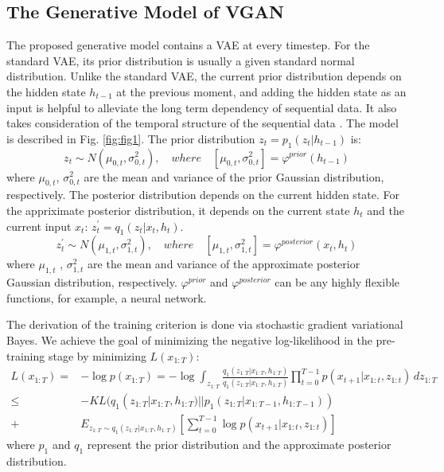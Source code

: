 \documentclass{llncs}
\begin{document}
\subsection{The Generative Model of VGAN}
	The proposed generative model contains a VAE at every timestep. For the standard VAE, its prior distribution is usually a given standard normal distribution. Unlike the standard VAE, the current prior distribution depends on the hidden state $h_{t-1}$ at the previous moment,  and adding the hidden state as an input is helpful to alleviate the long term dependency of sequential data. It also  takes consideration of the temporal structure of the sequential data \cite{chung2015a} \cite{serban2016a}. The model is described in Fig. \ref{fig:fig1}. The prior distribution $z_{t} = p_{1 }(z_{t}|h_{t-1})$ is:
% 
\begin{equation}
z_{t} \sim  N(\mu _{0,t},\sigma ^{2} _{0,t}) ,   \quad   where \quad  [\mu_{0,t},\sigma_{0,t}^2] = \varphi^{prior}(h_{t-1})
\label{eq:pathnode}
\end{equation}
where $\mu_{0,t}$, $\sigma_{0,t}^2$ are the mean and variance of the prior Gaussian distribution, respectively. The posterior distribution depends on the current hidden state.
For the appriximate posterior distribution, it depends on the current state $h_{t}$ and the current input $x_{t}$: $z_{t}^{\prime}=q_{1}(z_{t}|x_{t},h_{t})$.
\begin{equation}
z_{t}^{\prime} \sim N(\mu _{1,t},\sigma ^{2} _{1,t}) ,   \quad   where \quad  [\mu_{1,t},\sigma_{1,t}^2] = \varphi^{posterior}(x_{t},h_{t})
\label{eq:pathnode}
\end{equation}
where $\mu_{1,t}$ , $\sigma_{1,t}^2$  are the mean and variance of the approximate posterior Gaussian distribution, respectively. $\varphi^{prior}$ and $\varphi^{posterior}$  can be any highly flexible functions, for example, a neural network.


	The derivation of the training criterion is done via stochastic gradient variational Bayes. We achieve the goal of minimizing the negative log-likelihood in the pre-training stage by minimizing $L(x_{1:T})$:
\begin{equation}
\begin{aligned}
L(x_{1:T}) = & -\log p(x_{1:T}) 
=  -\log \int_{z_{1:T}} \frac{q_{1}(z_{1:T}|x_{1:T},h_{1:T})}{q_{1}(z_{1:T}|x_{1:T},h_{1:T})} \prod_{t=0}^{T-1} p(x_{t+1}|x_{1:t},z_{1:t}) \,dz_{1:T} \\
 \leq & -KL(q_{1}(z_{1:T}| x_{1:T},h_{1:T}) || p_{1}(z_{1:T}|x_{1:T-1},h_{1:T-1})) 
 \\ + & E_{z_{1:T}  \sim q_{1}(z_{1:T}|x_{1:T},h_{1:T})} \left [  \sum_{t=0}^{T-1}\log p(x_{t+1}|x_{1:t},z_{1:t}) \right ] 
 \label{eq:pathnode}
\end{aligned}
\end{equation}
where $p_{1}$ and $q_{1}$ represent the prior distribution and the approximate posterior distribution.
\end{document}
